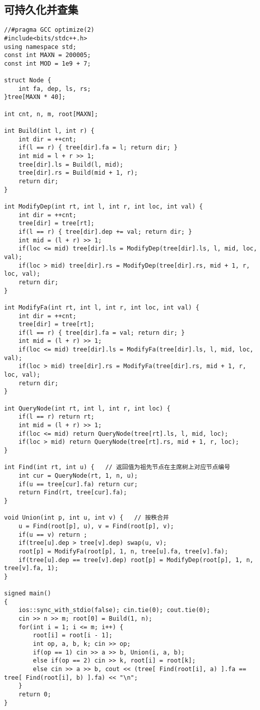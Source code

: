 \subsection{可持久化并查集}
\begin{lstlisting}
//#pragma GCC optimize(2)
#include<bits/stdc++.h>
using namespace std;
const int MAXN = 200005;
const int MOD = 1e9 + 7;

struct Node {
	int fa, dep, ls, rs;
}tree[MAXN * 40];

int cnt, n, m, root[MAXN];

int Build(int l, int r) {
	int dir = ++cnt;
	if(l == r) { tree[dir].fa = l; return dir; }
	int mid = l + r >> 1; 
	tree[dir].ls = Build(l, mid);
	tree[dir].rs = Build(mid + 1, r);
	return dir;
}

int ModifyDep(int rt, int l, int r, int loc, int val) {
	int dir = ++cnt;
	tree[dir] = tree[rt];
	if(l == r) { tree[dir].dep += val; return dir; }
	int mid = (l + r) >> 1;
	if(loc <= mid) tree[dir].ls = ModifyDep(tree[dir].ls, l, mid, loc, val);
	if(loc > mid) tree[dir].rs = ModifyDep(tree[dir].rs, mid + 1, r, loc, val); 
	return dir;
}

int ModifyFa(int rt, int l, int r, int loc, int val) {
	int dir = ++cnt;
	tree[dir] = tree[rt];
	if(l == r) { tree[dir].fa = val; return dir; }
	int mid = (l + r) >> 1;
	if(loc <= mid) tree[dir].ls = ModifyFa(tree[dir].ls, l, mid, loc, val);
	if(loc > mid) tree[dir].rs = ModifyFa(tree[dir].rs, mid + 1, r, loc, val); 
	return dir;
}

int QueryNode(int rt, int l, int r, int loc) {
	if(l == r) return rt;
	int mid = (l + r) >> 1;
	if(loc <= mid) return QueryNode(tree[rt].ls, l, mid, loc);
	if(loc > mid) return QueryNode(tree[rt].rs, mid + 1, r, loc);
}

int Find(int rt, int u) {	// 返回值为祖先节点在主席树上对应节点编号
	int cur = QueryNode(rt, 1, n, u);
	if(u == tree[cur].fa) return cur;
	return Find(rt, tree[cur].fa); 
}

void Union(int p, int u, int v) {	// 按秩合并
	u = Find(root[p], u), v = Find(root[p], v);
	if(u == v) return ;
	if(tree[u].dep > tree[v].dep) swap(u, v);
	root[p] = ModifyFa(root[p], 1, n, tree[u].fa, tree[v].fa);
	if(tree[u].dep == tree[v].dep) root[p] = ModifyDep(root[p], 1, n, tree[v].fa, 1);
}

signed main()
{
	ios::sync_with_stdio(false); cin.tie(0); cout.tie(0);
	cin >> n >> m; root[0] = Build(1, n);
	for(int i = 1; i <= m; i++) {
		root[i] = root[i - 1];
		int op, a, b, k; cin >> op;
		if(op == 1) cin >> a >> b, Union(i, a, b);
		else if(op == 2) cin >> k, root[i] = root[k];
		else cin >> a >> b, cout << (tree[ Find(root[i], a) ].fa == tree[ Find(root[i], b) ].fa) << "\n";
	}
	return 0;
}
\end{lstlisting}


